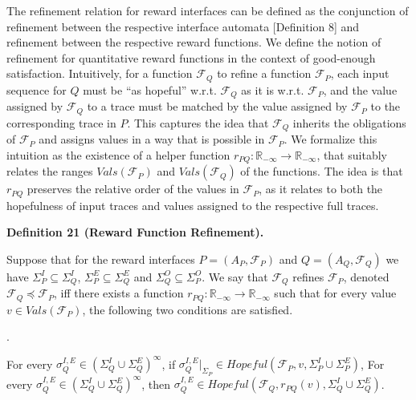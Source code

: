 \documentclass[10pt,a4paper]{article}
\begin{document}
 
 
The refinement relation for reward interfaces can be defined as the conjunction of refinement between the respective interface automata [Definition 8] and refinement between the respective reward functions. We define the notion of refinement for quantitative reward functions in the context of good-enough satisfaction. Intuitively, for a function $\mathcal{F}_{Q}$ to refine a function $\mathcal{F}_{P}$, each input sequence for $Q$ must be “as hopeful” w.r.t. $\mathcal{F}_{Q}$ as it is w.r.t. $\mathcal{F}_{P}$, and the value assigned by $\mathcal{F}_{Q}$ to a trace must be matched by the value assigned by $\mathcal{F}_{P}$ to the corresponding trace in $P$. This captures the idea that $\mathcal{F}_{Q}$ inherits the obligations of $\mathcal{F}_{P}$ and assigns values in a way that is possible in $\mathcal{F}_{P}$. We formalize this intuition as the existence of a helper function $r_{PQ}:\mathbb{R}_{-\infty}\to\mathbb{R}_{-\infty}$, that suitably relates the ranges $\mathit{Vals}(\mathcal{F}_{P})$ and $\mathit{Vals}(\mathcal{F}_{Q})$ of the functions. The idea is that $r_{PQ}$ preserves the relative order of the values in $\mathcal{F}_{P}$, as it relates to both the hopefulness of input traces and values assigned to the respective full traces.\par
 
 
 
\par\medskip\noindent\textbf{Definition 21 (Reward Function Refinement).}\par
 
 
Suppose that for the reward interfaces $P=(A_{P},\mathcal{F}_{P})$ and $Q=(A_{Q},\mathcal{F}_{Q})$ we have $\Sigma_{P}^{I}\subseteq\Sigma_{Q}^{I}$, $\Sigma_{P}^{E}\subseteq\Sigma_{Q}^{E}$ and $\Sigma_{Q}^{O}\subseteq\Sigma_{P}^{O}$. We say that $\mathcal{F}_{Q}$ refines $\mathcal{F}_{P}$, denoted $\mathcal{F}_{Q}\preceq\mathcal{F}_{P}$, iff there exists a function $r_{PQ}:\mathbb{R}_{-\infty}\to\mathbb{R}_{-\infty}$ such that for every value $v\in\mathit{Vals}(\mathcal{F}_{P})$, the following two conditions are satisfied.\par
  
\par{}. 
 
For every $\sigma_{Q}^{I,E}\in(\Sigma_{Q}^{I}\cup\Sigma_{Q}^{E})^{\infty}$, if $\sigma_{Q}^{I,E}|_{\Sigma_{P}}\in\mathit{Hopeful}(\mathcal{F}_{P},v,\Sigma_{P}^{I}\cup\Sigma_{P}^{E})$, For every $\sigma_{Q}^{I,E}\in(\Sigma_{Q}^{I}\cup\Sigma_{Q}^{E})^{\infty}$, then $\sigma_{Q}^{I,E}\in\mathit{Hopeful}(\mathcal{F}_{Q},r_{PQ}(v),\Sigma_{Q}^{I}\cup\Sigma_{Q}^{E})$.\par
 
\end{document}

